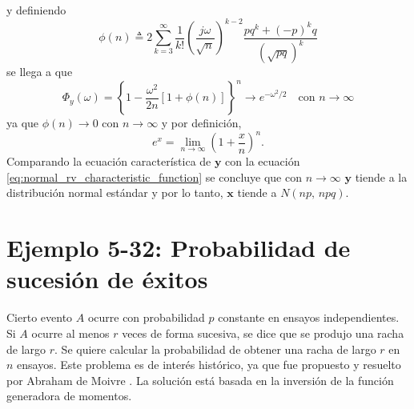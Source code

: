 \documentclass[a4paper]{report}
\newcommand{\x}{\mathbf{x}}
\newcommand{\y}{\mathbf{y}}
\begin{document}
y definiendo
\[
 \phi(n)\triangleq 2\sum_{k=3}^{\infty}\frac{1}{k!}\left(\frac{j\omega}{\sqrt{n}}\right)^{k-2}
  \frac{pq^k+(-p)^kq}{\left(\sqrt{pq}\right)^k}
\]
se llega a que
\[
 \Phi_y(\omega)=\left\{1-\frac{\omega^2}{2n}\left[1+\phi(n)\right]\right\}^n\to e^{-\omega^2/2}\quad\textrm{con }n\to\infty
\]
ya que \(\phi(n)\to0\) con \(n\to\infty\) y por definición,
\[
 e^{x}=\lim_{n\to\infty}\left(1+{\frac {x}{n}}\right)^{n}.
\]
Comparando la ecuación característica de \(\y\) con la ecuación \ref{eq:normal_rv_characteristic_function} se concluye que con \(n\to\infty\) \(\y\) tiende a la distribución normal estándar y por lo tanto, \(\x\) tiende a \(N(np,\,npq)\).

\section{Ejemplo 5-32: Probabilidad de sucesión de éxitos}

Cierto evento \(A\) ocurre con probabilidad \(p\) constante en ensayos independientes.
Si \(A\) ocurre al menos \(r\) veces de forma sucesiva, se dice que se produjo una racha de largo \(r\). Se quiere calcular la probabilidad de obtener una racha de largo \(r\) en \(n\) ensayos. Este problema es de interés histórico, ya que fue propuesto y resuelto por Abraham de Moivre \cite{papoulis2002probability}. La solución está basada en la inversión de la función generadora de momentos.
\end{document}
